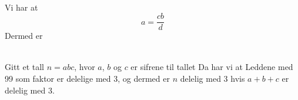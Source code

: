 




 \\
Vi har at
\[ a= \frac{cb}{d} \]
Dermed er

\\
Gitt et tall $n=abc $, hvor $ a $, $ b $ og $ c $ er sifrene til tallet 
Da har vi at
Leddene med 99 som faktor er delelige med 3, og dermed er $ n $ delelig med 3 hvis $ a+b+c $ er delelig med 3.



